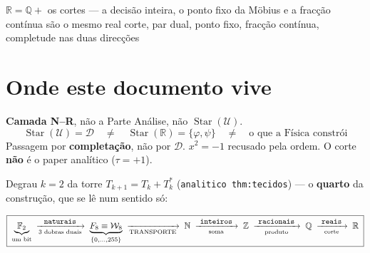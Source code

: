 \documentclass[11pt,a4paper]{article}
\newcommand{\code}[1]{\texttt{\small #1}}
\newcommand{\FF}{\mathbb{F}}
\newcommand{\Word}{\mathcal{W}}
\newcommand{\Q}{\mathbb{Q}}
\newcommand{\R}{\mathbb{R}}
\begin{document}
       {$\R=\Q+$ os cortes --- a decisão inteira, o ponto fixo da Möbius
        e a fracção contínua são o mesmo real}
       {corte, par dual, ponto fixo, fracção contínua, completude nas duas direcções}
\maketitle

\begin{abstract}
Degrau $k=2$ e último da cadeia aritmética. O real \textbf{não é uma tira de
casas}: é a \textbf{decisão} sobre cada racional --- abaixo ou acima ---, e a
decisão é inteira ($p^{n}$ contra $a\,q^{n}$). O corte é o \textbf{par dual}
deste andar: $(A,B)$ com $A\cup B=\Q$, e o quociente identifica aberto com
fechado. Três realizações --- o corte, o ponto fixo da Möbius e a fracção
contínua --- não são três aproximações: são \textbf{três representantes da mesma
classe}, e a equivalência mede-se (§\ref{sec:tres}). O corte existe porque o
ponto fixo da Möbius \emph{não está} em $\mathbb{P}^1(\Q)$, e isso prova-se em
duas linhas, sem varredura (§\ref{sec:porque}). A completude mede-se nas
\textbf{duas} direcções (§\ref{sec:continuidade}), e o que se paga é a
enumerabilidade (§\ref{sec:preco}).
\end{abstract}

\section*{Onde este documento vive}

\noindent\textbf{Camada N--R}, não a Parte Análise, não \(\operatorname{Star}(\mathcal{U})\).
\[
\boxed{\;
\operatorname{Star}(\mathcal{U})=\mathcal{D}
\quad\neq\quad
\operatorname{Star}(\mathbb{R})=\{\varphi,\psi\}
\quad\neq\quad
\text{o que a Física constrói}
\;}
\]
Passagem por \textbf{completação}, não por \(\mathcal{D}\). \(x^{2}=-1\) recusado pela ordem. O corte \textbf{não} é o paper analítico (\(\tau=+1\)).

Degrau $k=2$ da torre $T_{k+1}=T_k+T_k^{*}$ (\code{analitico thm:tecidos}) --- o
\textbf{quarto} da construção, que se lê num sentido só:

\[
\boxed{\;
\underbrace{\FF_2}_{\text{um bit}}
\;\xrightarrow[\text{3 dobras duais}]{\ \code{naturais}\ }\;
\underbrace{F_8\equiv\Word_8}_{\{0,\ldots,255\}}
\;\xrightarrow[\text{TRANSPORTE}]{}\;
\mathbb{N}
\;\xrightarrow[\text{soma}]{\ \code{inteiros}\ }\;
\mathbb{Z}
\;\xrightarrow[\text{produto}]{\ \code{racionais}\ }\;
\Q
\;\xrightarrow[\text{corte}]{\ \code{reais}\ }\;
\R\;}
\]
\end{document}
